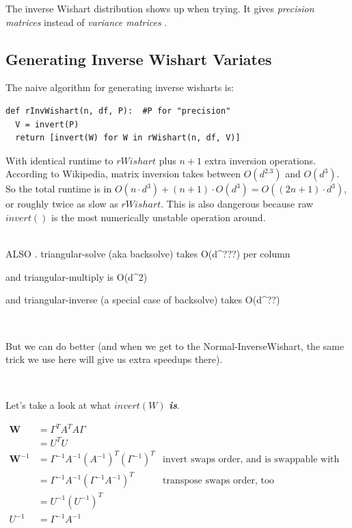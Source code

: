 \documentclass[english]{article}
\begin{document}
The inverse Wishart distribution shows up when trying. It gives \emph{precision
matrices} instead of \emph{variance matrices} .


\subsection*{Generating Inverse Wishart Variates}

The naive algorithm for generating inverse wisharts is:

\begin{lstlisting}
def rInvWishart(n, df, P):  #P for "precision"
  V = invert(P)
  return [invert(W) for W in rWishart(n, df, V)]
\end{lstlisting}


With identical runtime to $rWishart$ plus $n+1$ extra inversion
operations. According to Wikipedia,  matrix inversion takes between
$O(d^{2.3})$ and $O(d^{3})$. So the total runtime is in $O(n\cdot d^{3})+(n+1)\cdot O(d^{3})=O((2n+1)\cdot d^{3})$,
or roughly twice as slow as $rWishart$. This is also dangerous because
raw $invert()$ is the most numerically unstable operation around.\\
~

ALSO . triangular-solve (aka backsolve) takes O(d\textasciicircum{}???)
per column

and triangular-multiply is O(d\textasciicircum{}2)

and triangular-inverse (a special case of backsolve) takes O(d\textasciicircum{}??)



~

But we can do better (and when we get to the Normal-InverseWishart,
the same trick we use here will give us extra speedups there).

~

Let's take a look at what $invert(W)$ \textbf{\emph{is}}. 

\begin{align*}
\mathbf{W} & =\Gamma^{T}A^{T}A\Gamma\\
 & =U^{T}U\\
\mathbf{W}^{-1} & =\Gamma^{-1}A^{-1}\left(A^{-1}\right)^{T}\left(\Gamma^{-1}\right)^{T} & \text{invert swaps order, and is swappable with transpose}\\
 & =\Gamma^{-1}A^{-1}\left(\Gamma^{-1}A^{-1}\right)^{T} & \text{transpose swaps order, too}\\
 & =U^{-1}\left(U^{-1}\right)^{T}\\
U^{-1} & =\Gamma^{-1}A^{-1}
\end{align*}
\end{document}
